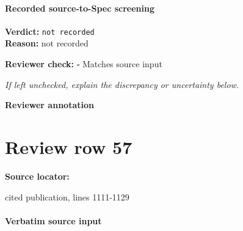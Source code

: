 \documentclass[10pt]{article}
\newcommand{\reviewerbox}{%
  \par\noindent\fbox{\parbox{0.96\linewidth}{\rule{0pt}{0.38in}}}\par
}
\newcommand{\reviewmatch}[1]{%
  \par\noindent\textbf{Reviewer check:} $\square$\; #1\par
  \noindent\emph{If left unchecked, explain the discrepancy or uncertainty below.}\par
}
\begin{document}
\paragraph{Recorded source-to-Spec screening}
\textbf{Verdict:} \texttt{not recorded}
\\
\textbf{Reason:} not recorded
\reviewmatch{Matches source input}
\noindent\textbf{Reviewer annotation}\par
\reviewerbox
\clearpage
\hypertarget{source-claim-a0520310d6532be1}{}
\section*{Review row 57}
\textbf{Source locator:} {\footnotesize\raggedright cited publication, lines 1111-\allowbreak{}1129\par}
\paragraph{Verbatim source input}
\end{document}
